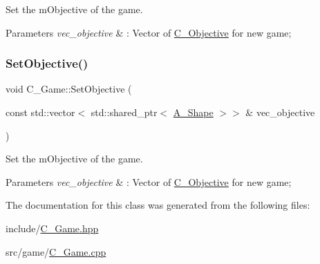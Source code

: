 Set the m\+Objective of the game. 


\begin{DoxyParams}{Parameters}
{\em vec\+\_\+objective} & \+: Vector of \hyperlink{classC__Objective}{C\+\_\+\+Objective} for new game; \\
\hline
\end{DoxyParams}
\mbox{\label{classC__Game_a0fa57725991fb2b249eb40dd776a68c4}} 
\subsubsection{\texorpdfstring{Set\+Objective()}{SetObjective()}\hspace{0.1cm}{\footnotesize\ttfamily [2/2]}}
{\footnotesize\ttfamily void C\+\_\+\+Game\+::\+Set\+Objective (\begin{DoxyParamCaption}\item[{const std\+::vector$<$ std\+::shared\+\_\+ptr$<$ \hyperlink{classA__Shape}{A\+\_\+\+Shape} $>$$>$ \&}]{vec\+\_\+objective }\end{DoxyParamCaption})}



Set the m\+Objective of the game. 


\begin{DoxyParams}{Parameters}
{\em vec\+\_\+objective} & \+: Vector of \hyperlink{classC__Objective}{C\+\_\+\+Objective} for new game; \\
\hline
\end{DoxyParams}


The documentation for this class was generated from the following files\+:\begin{DoxyCompactItemize}
\item 
include/\hyperlink{C__Game_8hpp}{C\+\_\+\+Game.\+hpp}\item 
src/game/\hyperlink{C__Game_8cpp}{C\+\_\+\+Game.\+cpp}\end{DoxyCompactItemize}
